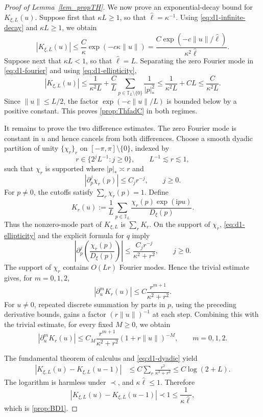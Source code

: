 \documentclass[10pt,reqno]{article}
\newcommand{\T}{\mathbb T}
\newcommand{\ii}{\mathrm{i}}
\theoremstyle{plain} %
\theoremstyle{remark}
\numberwithin{equation}{section}
\begin{document}
\begin{proof}[Proof of Lemma~\ref{lem_propTH}]
 

We now  prove an exponential-decay bound for $K_{\xi,L}(u)$. 
Suppose first that \(\kappa L\geq1\), so that
\(\widehat\ell=\kappa^{-1}\). 
Using \eqref{eq:d1-infinite-decay} and \(\kappa L\geq1\), we obtain
\[
 |K_{\xi,L}(u)|
 \leq \frac{C}{\kappa}\exp(-c\kappa\|u\|)
 =\frac{C\exp(-c\|u\|/\widehat\ell)}
 {\kappa^2\widehat\ell}.
\]
Suppose next that \(\kappa L<1\), so that \(\widehat\ell=L\). Separating
the zero Fourier mode in \eqref{eq:d1-fourier} and using
\eqref{eq:d1-ellipticity},
\[
 |K_{\xi,L}(u)|
 \leq \frac1{\kappa^2L}
 +\frac{C}{L}\sum_{p\in\T_L\setminus\{0\}}\frac1{|p|_*^2}
 \leq \frac1{\kappa^2L}+CL
 \leq \frac{C}{\kappa^2L}.
\]
Since \(\|u\|\leq L/2\), the factor
\(\exp(-c\|u\|/L)\) is bounded below by a positive constant. This proves
\eqref{prop:ThfadC} in both regimes.

It remains to prove the two difference estimates. The zero Fourier mode is constant in
\(u\) and hence cancels from both differences. Choose a smooth dyadic partition
of unity \(\{\chi_r\}_r\) on \([ -\pi,\pi]\setminus\{0\}\), indexed by
\[
 r\in\{2^jL^{-1}:j\geq0\},\qquad L^{-1}\lesssim r\lesssim1,
\]
such that \(\chi_r\) is supported where \(|p|_*\asymp r\) and
\[
 |\partial_p^j\chi_r(p)|\leq C_jr^{-j},\qquad j\geq0.
\]
For \(p\neq0\), the cutoffs satisfy \(\sum_r\chi_r(p)=1\). Define
\[
 K_r(u):=\frac1L\sum_{p\in\T_L}
 \frac{\chi_r(p)\exp(\ii pu)}{D_\xi(p)}.
\]
Thus the nonzero-mode part of \(K_{\xi,L}\) is \(\sum_rK_r\).
On the support of \(\chi_r\), \eqref{eq:d1-ellipticity} and the explicit
formula for \(q\) imply
\[
 \left|\partial_p^j\left(\frac{\chi_r(p)}{D_\xi(p)}\right)\right|
 \leq \frac{C_jr^{-j}}{\kappa^2+r^2},\qquad j\geq0.
\]
The support of \(\chi_r\) contains \(O(Lr)\) Fourier modes. Hence the
trivial estimate gives, for \(m=0,1,2\),
\[
 |\partial_u^mK_r(u)|\leq C\frac{r^{m+1}}{\kappa^2+r^2}.
\]
For \(u\neq0\), repeated discrete summation by parts in \(p\), using the
preceding derivative bounds, gains a factor \((r\|u\|)^{-1}\) at each
step. Combining this with the trivial estimate, for every fixed \(M\geq0\),
we obtain
\begin{equation}\label{eq:d1-dyadic}
 |\partial_u^m K_r(u)|
 \leq C_M\frac{r^{m+1}}{\kappa^2+r^2}
 (1+r\|u\|)^{-M},\qquad m=0,1,2.
\end{equation}

 The fundamental theorem of calculus and
\eqref{eq:d1-dyadic} yield
\begin{align*}
 |K_{\xi,L}(u)-K_{\xi,L}(u-1)|
 &\leq C\sum_r\frac{r^2}{\kappa^2+r^2}
 \leq C\log(2+L).
\end{align*}
The logarithm is harmless under \(\prec\), and
\(\kappa\widehat\ell\leq1\). Therefore
\[
 |K_{\xi,L}(u)-K_{\xi,L}(u-1)|
 \prec1\leq\frac1{\kappa\widehat\ell},
\]
which is \eqref{prop:BD1}.


\end{proof}
\end{document}
